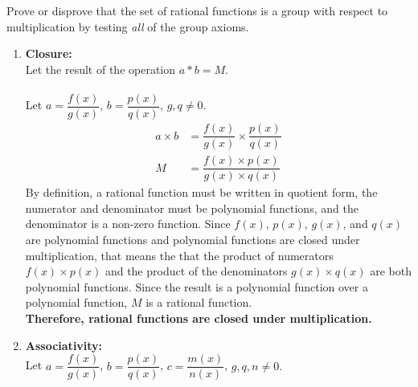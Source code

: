 \documentclass[12pt]{book}
\begin{document}
\begin{enumerate}
Prove or disprove that the set of rational functions is a group with respect to multiplication by testing \emph{all} of the group axioms.

\begin{enumerate}
    \item \textbf{Closure:}\\   %
    Let the result of the operation $a * b = M$.\\\\
    Let $a = \dfrac{f(x)}{g(x)}$, $b = \dfrac{p(x)}{q(x)}$, $g, q \neq 0.$\\
    \setcounter{equation}{0}
    \begin{align}
        a \times b &= \dfrac{f(x)}{g(x)} \times \dfrac{p(x)}{q(x)}\\
        M &= \dfrac{f(x) \times p(x)}{g(x) \times q(x)}
    \end{align}
    By definition, a rational function must be written in quotient form, the numerator and denominator must be polynomial functions, and the denominator is a non-zero function. Since $f(x)$, $p(x)$, $g(x)$, and $q(x)$ are polynomial functions and polynomial functions are closed under multiplication, that means the that the product of numerators $f(x) \times p(x)$ and the product of the denominators $g(x) \times q(x)$ are both polynomial functions. Since the result is a polynomial function over a polynomial function, $M$ is a rational function.\\
    
    \textbf{Therefore, rational functions are closed under multiplication.}\\
    
    \item \textbf{Associativity:}\\     %
    Let $a = \dfrac{f(x)}{g(x)}$, $b = \dfrac{p(x)}{q(x)}$, $c = \dfrac{m(x)}{n(x)}$, $g, q, n \neq 0.$\\
    

\end{enumerate}
\end{enumerate}
\end{document}
